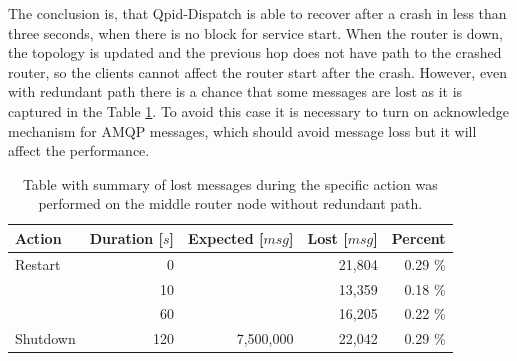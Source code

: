 The conclusion is, that Qpid-Dispatch is able to recover after a crash in less than three seconds, when there is no block for service start. When the router is down, the topology is updated and the previous hop does not have path to the crashed router, so the clients cannot affect the router start after the crash. However, even with redundant path there is a chance that some messages are lost as it is captured in the Table \ref{tab:agent_redundant_lost}. To avoid this case it is necessary to turn on acknowledge mechanism for AMQP messages, which should avoid message loss but it will affect the performance.

\begingroup
\setlength{\tabcolsep}{10pt} %
\renewcommand{\arraystretch}{1.35} %
	\begin{table}[H]
	\centering
	\begin{tabular}{|l|r|r|r|r|}
	\hline
	\rowcolor[HTML]{C5E3DF}
	\textbf{Action} & \textbf{Duration [$s$]} & \textbf{Expected [$msg$]} & \textbf{Lost [$msg$]} & \textbf{Percent} \\ \hline
	Restart & 0 & & 21,804 & 0.29 \% \\ \cline{1-2} \cline{4-5}
	 & 10 & & 13,359 & 0.18 \% \\ \cline{2-2} \cline{4-5}
	 & 60 & & 16,205 & 0.22 \% \\ \cline{2-2} \cline{4-5}
	\multirow{-3}{*}{Shutdown} & 120 & \multirow{-4}{*}{7,500,000} & 22,042 & 0.29 \% \\ \hline
	\end{tabular}
	\caption{Table with summary of lost messages during the specific action was performed on the middle router node without redundant path.}
	\label{tab:agent_redundant_lost}
	\end{table}
\endgroup
